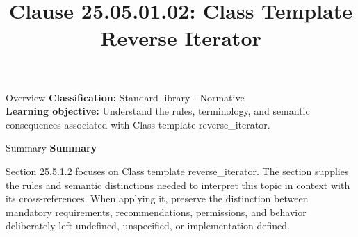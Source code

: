 \documentclass[10pt,letterpaper]{article}
\title{Clause 25.05.01.02: Class Template Reverse Iterator}
\author{}
\date{}
\begin{document}
\maketitle
\begin{CornellOverviewBox}{Overview}
\textbf{Classification:} Standard library - Normative\\[2pt]
\textbf{Learning objective:} Understand the rules, terminology, and semantic consequences associated with Class template reverse\_iterator.
\end{CornellOverviewBox}\begin{CornellSummaryBox}{Summary}
{\sffamily\bfseries\color{Accent} Summary}\par\vspace{3pt}Section 25.5.1.2 focuses on Class template reverse\_iterator. The section supplies the rules and semantic distinctions needed to interpret this topic in context with its cross-references. When applying it, preserve the distinction between mandatory requirements, recommendations, permissions, and behavior deliberately left undefined, unspecified, or implementation-defined.
\end{CornellSummaryBox}
\end{document}
